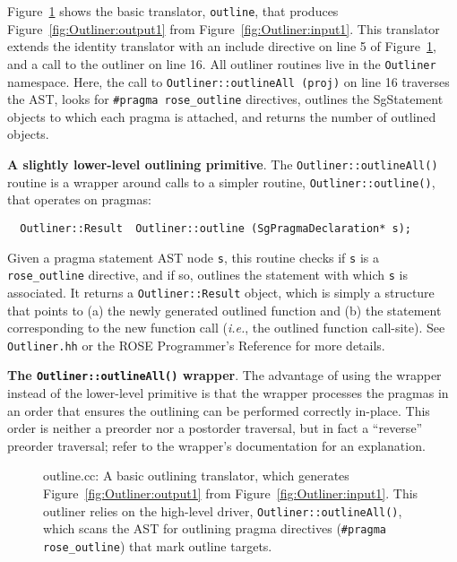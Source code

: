 Figure~\ref{fig:Outliner:basic} shows the basic translator,
\texttt{outline}, that produces Figure~\ref{fig:Outliner:output1}
from Figure~\ref{fig:Outliner:input1}. This translator extends the
identity translator with an include directive on line 5 of
Figure~\ref{fig:Outliner:basic}, and a call to the outliner on
line 16. All outliner routines live in the \texttt{Outliner}
namespace. Here, the call to \texttt{Outliner::outlineAll (proj)}
on line 16 traverses the AST, looks for \texttt{\#pragma
rose\_outline} directives, outlines the SgStatement objects to which
each pragma is attached, and returns the number of outlined objects.

\textbf{A slightly lower-level outlining primitive}. The
\texttt{Outliner::outlineAll()} routine is a wrapper around calls
to a simpler routine, \texttt{Outliner::outline()}, that operates
on pragmas:
%
\begin{lstlisting}
  Outliner::Result  Outliner::outline (SgPragmaDeclaration* s);
\end{lstlisting}
%
Given a pragma statement AST node \texttt{s}, this routine checks if
\texttt{s} is a \texttt{rose\_outline} directive, and if so, outlines
the statement with which \texttt{s} is associated. It returns a
\texttt{Outliner::Result} object, which is simply a structure that
points to (a) the newly generated outlined function and (b) the
statement corresponding to the new function call (\emph{i.e.}, the
outlined function call-site). See \texttt{Outliner.hh} or the ROSE
Programmer's Reference for more details.

\textbf{The \texttt{Outliner::outlineAll()} wrapper}. The advantage
of using the wrapper instead of the lower-level primitive is that the
wrapper processes the pragmas in an order that ensures the outlining
can be performed correctly in-place. This order is neither a preorder
nor a postorder traversal, but in fact a ``reverse'' preorder
traversal; refer to the wrapper's documentation for an explanation.

\begin{figure}[!h]
{\indent
{\mySmallFontSize
\begin{latexonly}
   
\end{latexonly}
\begin{htmlonly}
   
\end{htmlonly}

}
}
\caption{outline.cc: A basic outlining translator, which generates
Figure~\ref{fig:Outliner:output1} from
Figure~\ref{fig:Outliner:input1}. This outliner relies on the
high-level driver, \texttt{Outliner::outlineAll()}, which scans the
AST for outlining pragma directives (\texttt{\#pragma rose\_outline})
that mark outline targets.}
\label{fig:Outliner:basic}
\end{figure}
